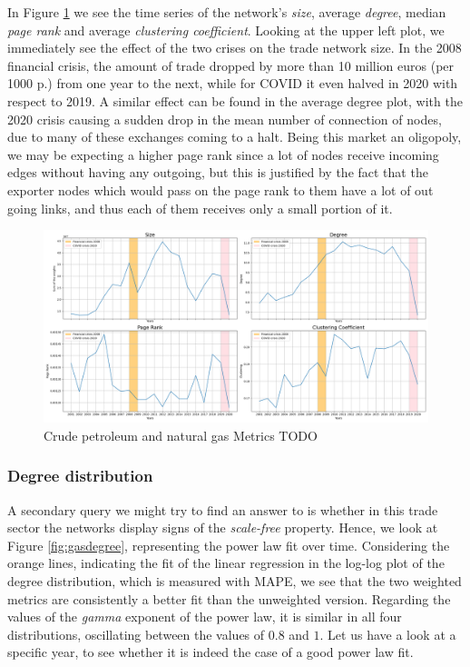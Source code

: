 In Figure \ref{fig:gasmetrics} we see the time series of the network's \textit{size}, average \textit{degree}, median \textit{page rank} and average \textit{clustering coefficient}. Looking at the upper left plot, we immediately see the effect of the two crises on the trade network size. In the 2008 financial crisis, the amount of trade dropped by more than 10 million euros (per 1000 p.) from one year to the next, while for COVID it even halved in 2020 with respect to 2019. A similar effect can be found in the average degree plot, with the 2020 crisis causing a sudden drop in the mean number of connection of nodes, due to many of these exchanges coming to a halt. Being this market an oligopoly, we may be expecting a higher page rank since a lot of nodes receive incoming edges without having any outgoing, but this is justified by the fact that the exporter nodes which would pass on the page rank to them have a lot of out going links, and thus each of them receives only a small portion of it.

\begin{figure}
    \centering
    \includegraphics[width=\textwidth]{pics/full_p06_metric_ts.png}
    \caption{Crude petroleum and natural gas Metrics TODO}
    \label{fig:gasmetrics}
\end{figure}

\subsubsection*{Degree distribution}

A secondary query we might try to find an answer to is whether in this trade sector the networks display signs of the \textit{scale-free} property. Hence, we look at Figure \ref{fig:gasdegree}, representing the power law fit over time. Considering the orange lines, indicating the fit of the linear regression in the log-log plot of the degree distribution, which is measured with MAPE, we see that the two weighted metrics are consistently a better fit than the unweighted version. Regarding the values of the \textit{gamma} exponent of the power law, it is similar in all four distributions, oscillating between the values of $0.8$ and $1$. Let us have a look at a specific year, to see whether it is indeed the case of a good power law fit.


